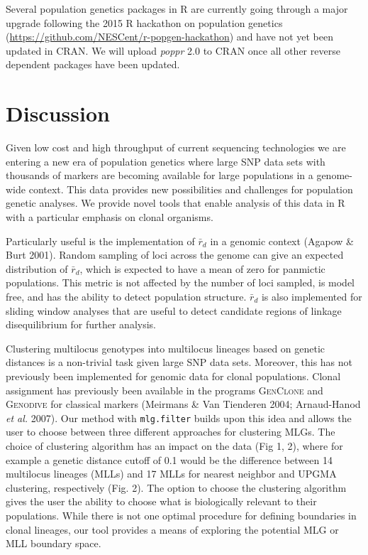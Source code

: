 \documentclass[double,12pt]{beavtex}
\begin{document}
  Several population genetics packages in R are currently going through a
  major upgrade following the 2015 R hackathon on population genetics
  (\url{https://github.com/NESCent/r-popgen-hackathon}) and have not yet
  been updated in CRAN. We will upload \emph{poppr} 2.0 to CRAN once all
  other reverse dependent packages have been updated.
  
  \section{Discussion}\label{discussion}
  
  Given low cost and high throughput of current sequencing technologies we
  are entering a new era of population genetics where large SNP data sets
  with thousands of markers are becoming available for large populations
  in a genome- wide context. This data provides new possibilities and
  challenges for population genetic analyses. We provide novel tools that
  enable analysis of this data in R with a particular emphasis on clonal
  organisms.
  
  Particularly useful is the implementation of \(\bar{r}_d\) in a genomic
  context (Agapow \& Burt 2001). Random sampling of loci across the genome
  can give an expected distribution of \(\bar{r}_d\), which is expected to
  have a mean of zero for panmictic populations. This metric is not
  affected by the number of loci sampled, is model free, and has the
  ability to detect population structure. \(\bar{r}_d\) is also
  implemented for sliding window analyses that are useful to detect
  candidate regions of linkage disequilibrium for further analysis.
  
  Clustering multilocus genotypes into multilocus lineages based on
  genetic distances is a non-trivial task given large SNP data sets.
  Moreover, this has not previously been implemented for genomic data for
  clonal populations. Clonal assignment has previously been available in
  the programs \textsc{GenClone} and \textsc{Genodive} for classical
  markers (Meirmans \& Van Tienderen 2004; Arnaud-Hanod \emph{et al.}
  2007). Our method with \texttt{mlg.filter} builds upon this idea and
  allows the user to choose between three different approaches for
  clustering MLGs. The choice of clustering algorithm has an impact on the
  data (Fig 1, 2), where for example a genetic distance cutoff of 0.1
  would be the difference between 14 multilocus lineages (MLLs) and 17
  MLLs for nearest neighbor and UPGMA clustering, respectively (Fig. 2).
  The option to choose the clustering algorithm gives the user the ability
  to choose what is biologically relevant to their populations. While
  there is not one optimal procedure for defining boundaries in clonal
  lineages, our tool provides a means of exploring the potential MLG or
  MLL boundary space.
  
\end{document}
